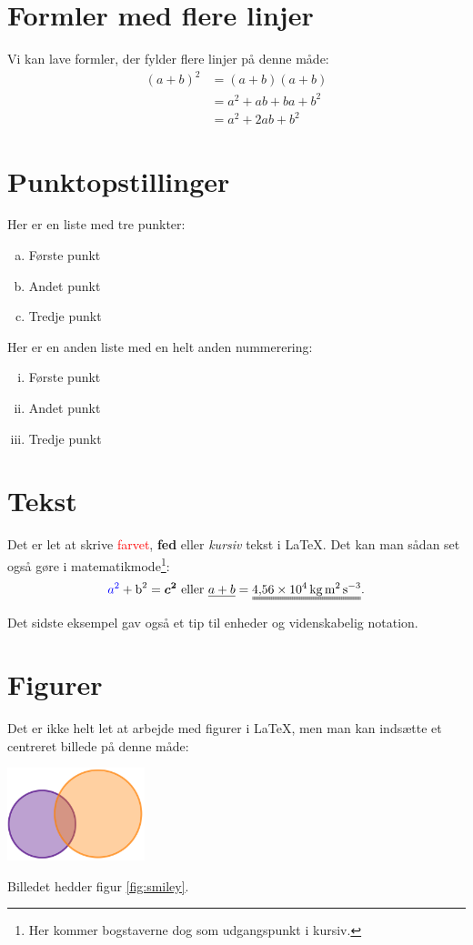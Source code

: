 \documentclass[a4paper,12pt,oneside,article]{memoir}
\begin{document}
\section*{Formler med flere linjer}
Vi kan lave formler, der fylder flere linjer på denne måde:
\begin{align*}
	(a+b)^2 &= (a+b)(a+b)\\
	&= a^2+ab+ba+b^2\\
	&=a^2+2ab+b^2
\end{align*}
\section*{Punktopstillinger}
Her er en liste med tre punkter:
\begin{enumerate}[a)]
\item Første punkt
\item Andet punkt
\item Tredje punkt
\end{enumerate}

Her er en anden liste med en helt anden nummerering:
\begin{enumerate}[i)]
\item Første punkt
\item Andet punkt
\item Tredje punkt
\end{enumerate}

\section*{Tekst}
Det er let at skrive \textcolor{red}{farvet}, \textbf{fed} eller \textit{kursiv} tekst i \LaTeX. Det kan man sådan set også gøre i matematikmode\footnote{Her kommer bogstaverne dog som udgangspunkt i kursiv.}:
\begin{equation*}
	\textcolor{blue}{a^2}+\textrm{b}^2=\bm{c^2} \text{ eller } \uline{a+b}=\uuline{\SI{4,56e4}{kg.m^2.s^{-3}}{}}.
\end{equation*}
Det sidste eksempel gav også et tip til enheder og videnskabelig notation.

\section*{Figurer}

Det er ikke helt let at arbejde med figurer i \LaTeX, men man kan indsætte et centreret billede på denne måde:
\begin{center}
\includegraphics[width=4cm]{cirkler.png}
\label{fig:smiley}
\end{center}
Billedet hedder figur \ref{fig:smiley}.
\end{document}
